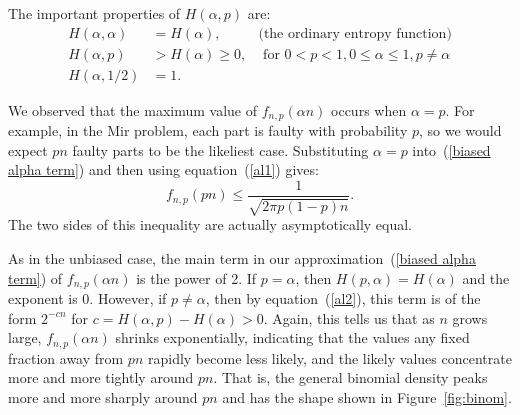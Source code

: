 \documentclass[11pt,twoside]{article}
\begin{document}
The important properties of $H(\alpha,p)$ are:
\begin{align}
H(\alpha, \alpha) & = H(\alpha), & \text{(the ordinary entropy function)} \label{al1}\\
H(\alpha, p) & >  H(\alpha)\geq 0, & \text{ for } 0 < p <1, 0 \leq \alpha
\leq 1, p \neq \alpha \label{al2}\\
H(\alpha, 1/2) & =  1 \label{al3}.
\end{align}

We observed that the maximum value of $f_{n, p}(\alpha n)$ occurs when
$\alpha = p$.  For example, in the Mir problem, each part is faulty with
probability $p$, so we would expect $p n$ faulty parts to be the likeliest
case.  Substituting $\alpha = p$ into~(\ref{biased alpha
term}) and then using equation~(\ref{al1}) gives:
\[
f_{n,p}(pn) \leq \frac{1}{\sqrt{2 \pi p (1-p) n}}.
\]
The two sides of this inequality are actually asymptotically equal.

As in the unbiased case, the main term in our approximation~(\ref{biased
alpha term}) of $f_{n, p}(\alpha n)$ is the power of 2.  If $p = \alpha$,
then $H(p,\alpha)=H(\alpha)$ and the exponent is 0.  However, if $p \neq
\alpha$, then by equation~(\ref{al2}), this term is of the form $2^{-cn}$
for $c = H(\alpha, p) - H(\alpha) > 0$.  Again, this tells us that as $n$
grows large, $f_{n,p}(\alpha n)$ shrinks exponentially, indicating that
the values any fixed fraction away from
$pn$ rapidly become less likely, and the likely values concentrate more
and more tightly around $pn$.  That is, the general binomial density peaks
more and more sharply around $pn$ and has the shape shown in
Figure~\ref{fig:binom}.
\end{document}
